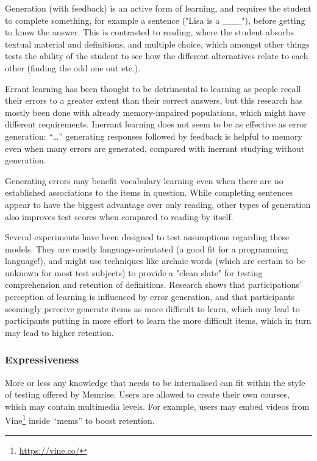 Generation (with feedback) is an active form of learning, and requires the
student to complete something, for example a sentence ("Lisa is a \_\_\_"),
before getting to know the answer. This is contrasted to reading, where the
student absorbs textual material and definitions, and multiple choice, which
amongst other things tests the ability of the student to see how the different
alternatives relate to each other (finding the odd one out etc.).

Errant learning has been thought to be detrimental to learning as people
recall their errors to a greater extent than their correct
answers\cite{potts2014benefit}, but this research has mostly been done with
already memory-impaired populations, which might have different requirements.
Inerrant learning does not seem to be as effective as error generation: 
``\dots'' generating responses followed by feedback is helpful to memory 
even when many errors are generated, compared with inerrant studying without
generation\cite[p.54]{potts2014benefit}.

Generating errors may benefit vocabulary learning even when there are no 
established associations to the items in 
question\cite[p.54]{potts2014benefit}. While completing sentences appear to 
have the biggest advantage over only reading, other types of generation also 
improves test scores when compared to reading by 
itself\cite[p.73]{benassi2014applying}.

Several experiments have been designed to test assumptions regarding
these models. They are mostly language-orientated (a good fit for a 
programming language!), and might use techniques like archaic words (which are 
certain to be unknown for most test subjects) to provide a "clean slate" for 
testing comprehension and retention of definitions. Research shows that 
participations' perception of learning is influenced by error generation, and 
that participants seemingly perceive generate items as more difficult to 
learn, which may lead to participants putting in more effort to learn the more 
difficult items, which in turn may lead to higher 
retention\cite{potts2014benefit}.

\subsubsection{Expressiveness}

More or less any knowledge that needs to be internalised can fit within the
style of testing offered by Memrise. Users are allowed to create their own
courses, which may contain multimedia levels. For example, users may embed 
videos from Vine\footnote{\url{https://vine.co/}} inside ``mems'' to boost 
retention. 

